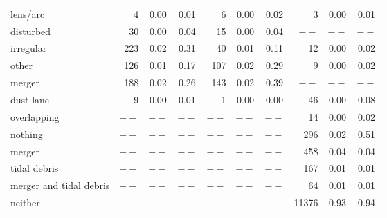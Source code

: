 \documentclass[iop,apj,tighten]{emulateapj}
\begin{document}
\begin{table*}
\begin{tabular}{l|rcc|rcc|rcc}
    lens/arc                &      4 & 0.00 & 0.01 &      6 & 0.00 & 0.02       &      3 & 0.00 & 0.01                                                   \\
    disturbed               &     30 & 0.00 & 0.04 &     15 & 0.00 & 0.04       &   $--$ & $--$ & $--$                                                   \\
    irregular               &    223 & 0.02 & 0.31 &     40 & 0.01 & 0.11       &     12 & 0.00 & 0.02                                                   \\
    other                   &    126 & 0.01 & 0.17 &    107 & 0.02 & 0.29       &      9 & 0.00 & 0.02                                                   \\
    merger                  &    188 & 0.02 & 0.26 &    143 & 0.02 & 0.39       &   $--$ & $--$ & $--$                                                   \\
    dust lane               &      9 & 0.00 & 0.01 &      1 & 0.00 & 0.00       &     46 & 0.00 & 0.08                                                   \\
    overlapping             &  $--$  & $--$ & $--$ &   $--$ & $--$ & $--$       &     14 & 0.00 & 0.02                                                   \\
    nothing                 &  $--$  & $--$ & $--$ &   $--$ & $--$ & $--$       &    296 & 0.02 & 0.51                                                   \\
    \hline                                                                                     
    merger                  & $--$ & $--$ & $--$ & $--$ & $--$ & $--$           &    458 & 0.04 & 0.04                               \\
    tidal debris            & $--$ & $--$ & $--$ & $--$ & $--$ & $--$           &    167 & 0.01 & 0.01                               \\
    merger and tidal debris & $--$ & $--$ & $--$ & $--$ & $--$ & $--$           &     64 & 0.01 & 0.01                               \\
    neither                 & $--$ & $--$ & $--$ & $--$ & $--$ & $--$           &  11376 & 0.93 & 0.94                               \\
\hline\hline
\end{tabular}
\end{table*}
                                           
\end{document}
